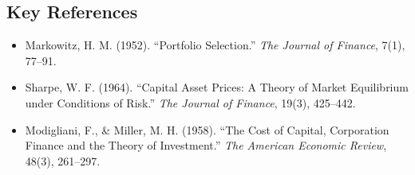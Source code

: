 \subsection*{Key References}
\begin{itemize}
    \item Markowitz, H. M. (1952). ``Portfolio Selection.'' \textit{The Journal of Finance}, 7(1), 77--91.
    \item Sharpe, W. F. (1964). ``Capital Asset Prices: A Theory of Market Equilibrium under Conditions of Risk.'' \textit{The Journal of Finance}, 19(3), 425--442.
    \item Modigliani, F., \& Miller, M. H. (1958). ``The Cost of Capital, Corporation Finance and the Theory of Investment.'' \textit{The American Economic Review}, 48(3), 261--297.
\end{itemize}
